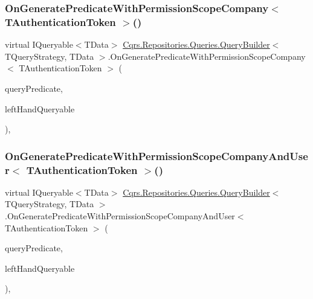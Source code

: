\subsubsection{\texorpdfstring{On\+Generate\+Predicate\+With\+Permission\+Scope\+Company$<$ T\+Authentication\+Token $>$()}{OnGeneratePredicateWithPermissionScopeCompany< TAuthenticationToken >()}}
{\footnotesize\ttfamily virtual I\+Queryable$<$T\+Data$>$ \hyperlink{classCqrs_1_1Repositories_1_1Queries_1_1QueryBuilder}{Cqrs.\+Repositories.\+Queries.\+Query\+Builder}$<$ T\+Query\+Strategy, T\+Data $>$.On\+Generate\+Predicate\+With\+Permission\+Scope\+Company$<$ T\+Authentication\+Token $>$ (\begin{DoxyParamCaption}\item[{\hyperlink{classCqrs_1_1Repositories_1_1Queries_1_1QueryPredicate}{Query\+Predicate}}]{query\+Predicate,  }\item[{I\+Queryable$<$ T\+Data $>$}]{left\+Hand\+Queryable }\end{DoxyParamCaption})\hspace{0.3cm}{\ttfamily [protected]}, {\ttfamily [virtual]}}

\mbox{\label{classCqrs_1_1Repositories_1_1Queries_1_1QueryBuilder_aded996242ae739440270f227ad777635_aded996242ae739440270f227ad777635}} 
\subsubsection{\texorpdfstring{On\+Generate\+Predicate\+With\+Permission\+Scope\+Company\+And\+User$<$ T\+Authentication\+Token $>$()}{OnGeneratePredicateWithPermissionScopeCompanyAndUser< TAuthenticationToken >()}}
{\footnotesize\ttfamily virtual I\+Queryable$<$T\+Data$>$ \hyperlink{classCqrs_1_1Repositories_1_1Queries_1_1QueryBuilder}{Cqrs.\+Repositories.\+Queries.\+Query\+Builder}$<$ T\+Query\+Strategy, T\+Data $>$.On\+Generate\+Predicate\+With\+Permission\+Scope\+Company\+And\+User$<$ T\+Authentication\+Token $>$ (\begin{DoxyParamCaption}\item[{\hyperlink{classCqrs_1_1Repositories_1_1Queries_1_1QueryPredicate}{Query\+Predicate}}]{query\+Predicate,  }\item[{I\+Queryable$<$ T\+Data $>$}]{left\+Hand\+Queryable }\end{DoxyParamCaption})\hspace{0.3cm}{\ttfamily [protected]}, {\ttfamily [virtual]}}

